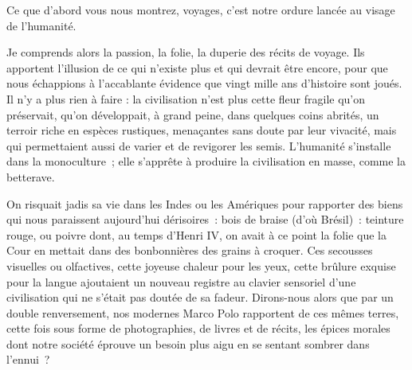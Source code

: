 
{\label{lévi-strauss-liban2022}Ce que d'abord vous nous montrez, voyages, c'est notre ordure lancée
au visage de l'humanité.

Je comprends alors la passion, la folie, la duperie des récits de
voyage. Ils apportent l'illusion de ce qui n'existe plus et qui
devrait être encore, pour que nous échappions à l'accablante évidence
que vingt mille ans d'histoire sont joués. Il n'y a plus rien à faire
: la civilisation n'est plus cette fleur fragile qu'on préservait,
qu'on développait, à grand peine, dans quelques coins abrités, un
terroir riche en espèces rustiques, menaçantes sans doute par leur
vivacité, mais qui permettaient aussi de varier et de revigorer les
semis. L'humanité s'installe dans la monoculture~; elle s'apprête à
produire la civilisation en masse, comme la betterave.

On risquait jadis sa vie dans les Indes ou les Amériques pour
rapporter des biens qui nous paraissent aujourd'hui dérisoires~: bois
de braise (d'où Brésil)~: teinture rouge, ou poivre dont, au temps
d'Henri IV, on avait à ce point la folie que la Cour en mettait dans
des bonbonnières des grains à croquer. Ces secousses visuelles ou
olfactives, cette joyeuse chaleur pour les yeux, cette brûlure
exquise pour la langue ajoutaient un nouveau registre au clavier
sensoriel d'une civilisation qui ne s'était pas doutée de sa fadeur.
Dirons-nous alors que par un double renversement, nos modernes Marco
Polo rapportent de ces mêmes terres, cette fois sous forme de
photographies, de livres et de récits, les épices morales dont notre
société éprouve un besoin plus aigu en se sentant sombrer dans
l'ennui~?
}

